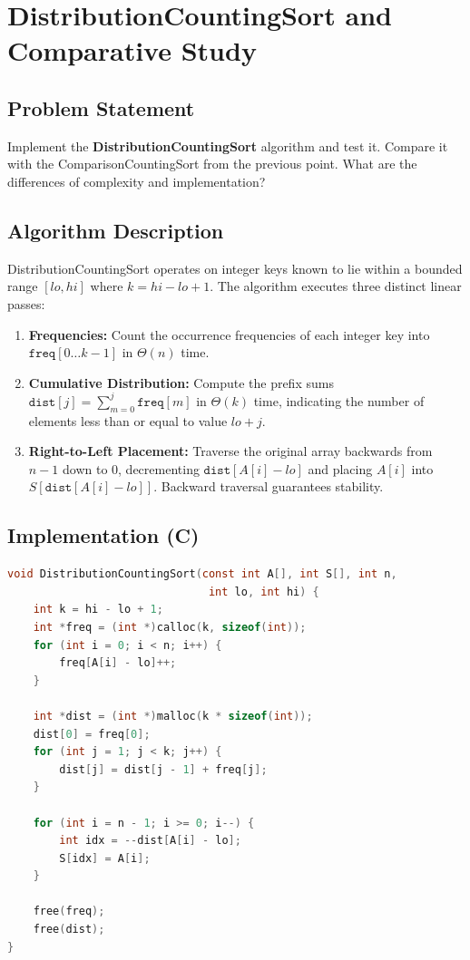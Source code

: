 \documentclass[12pt,a4paper]{article}
\theoremstyle{plain}
\theoremstyle{definition}
\theoremstyle{remark}
\begin{document}
\newpage
\section{DistributionCountingSort and Comparative Study}

\subsection{Problem Statement}
Implement the \textbf{DistributionCountingSort} algorithm and test it. Compare it with the ComparisonCountingSort from the previous point. What are the differences of complexity and implementation?

\subsection{Algorithm Description}
DistributionCountingSort operates on integer keys known to lie within a bounded range $[lo, hi]$ where $k = hi - lo + 1$. The algorithm executes three distinct linear passes:
\begin{enumerate}[leftmargin=2em]
  \item \textbf{Frequencies:} Count the occurrence frequencies of each integer key into $\texttt{freq}[0\dots k-1]$ in $\Theta(n)$ time.
  \item \textbf{Cumulative Distribution:} Compute the prefix sums $\texttt{dist}[j] = \sum_{m=0}^{j} \texttt{freq}[m]$ in $\Theta(k)$ time, indicating the number of elements less than or equal to value $lo + j$.
  \item \textbf{Right-to-Left Placement:} Traverse the original array backwards from $n-1$ down to $0$, decrementing $\texttt{dist}[A[i] - lo]$ and placing $A[i]$ into $S[\texttt{dist}[A[i]-lo]]$. Backward traversal guarantees stability.
\end{enumerate}

\subsection{Implementation (C)}
\begin{lstlisting}[language=C, caption={distribution\_counting\_sort.c -- Three-phase linear sort}]
void DistributionCountingSort(const int A[], int S[], int n,
                               int lo, int hi) {
    int k = hi - lo + 1;
    int *freq = (int *)calloc(k, sizeof(int));
    for (int i = 0; i < n; i++) {
        freq[A[i] - lo]++;
    }

    int *dist = (int *)malloc(k * sizeof(int));
    dist[0] = freq[0];
    for (int j = 1; j < k; j++) {
        dist[j] = dist[j - 1] + freq[j];
    }

    for (int i = n - 1; i >= 0; i--) {
        int idx = --dist[A[i] - lo];
        S[idx] = A[i];
    }

    free(freq);
    free(dist);
}
\end{lstlisting}
\end{document}
